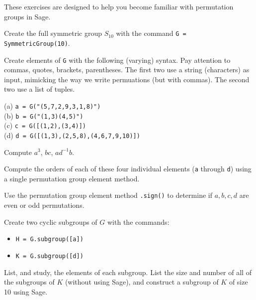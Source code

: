 These exercises are designed to help you become familiar with permutation groups in Sage.
%
\begin{sageverbatim}\end{sageverbatim}
%
%
Create the full symmetric group $S_{10}$ with the command \verb?G = SymmetricGroup(10)?.
\begin{sageverbatim}\end{sageverbatim}
%
Create elements of \verb?G? with the following (varying) syntax.  Pay attention to commas, quotes, brackets, parentheses.  The first two use a string (characters) as input, mimicking the way we write permuations (but with commas).  The second two use a list of tuples.\par\noindent
(a) \verb?a = G("(5,7,2,9,3,1,8)")?\\
(b) \verb?b = G("(1,3)(4,5)")?\\
(c) \verb?c = G([(1,2),(3,4)])?\\
(d) \verb?d = G([(1,3),(2,5,8),(4,6,7,9,10)])?
\begin{sageverbatim}\end{sageverbatim}
%
%
Compute $a^3$, $bc$, $ad^{-1}b$.
\begin{sageverbatim}\end{sageverbatim}
%
%
Compute the orders of each of these four individual elements (\verb?a? through \verb?d?) using a single permutation group element method.
\begin{sageverbatim}\end{sageverbatim}
%
Use the permutation group element method \verb?.sign()? to determine if $a,b,c,d$ are even or odd permutations.
\begin{sageverbatim}\end{sageverbatim}
%
Create two cyclic subgroups of $G$ with the commands:
%
\begin{itemize}
\item\verb?H = G.subgroup([a])?
\item\verb?K = G.subgroup([d])?
\end{itemize}
%
List, and study, the elements of each subgroup.  List the size and number of all of the subgroups of $K$ (without using Sage), and construct a subgroup of $K$ of size 10 using Sage.
